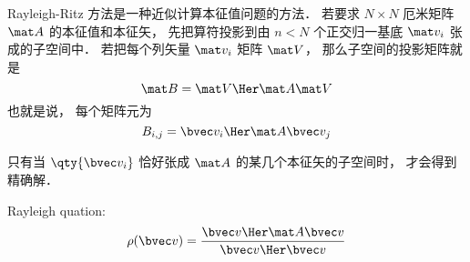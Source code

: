 
\begin{issues}
\issueDraft
\end{issues}


Rayleigh-Ritz 方法是一种近似计算本征值问题的方法． 若要求 $N\times N$ 厄米矩阵 $\mat A$ 的本征值和本征矢， 先把算符投影到由 $n < N$ 个正交归一基底 $\mat v_i$ 张成的子空间中． 若把每个列矢量 $\mat v_i$ 矩阵 $\mat V$， 那么子空间的投影矩阵就是
\begin{equation}
\mat B = \mat V\Her \mat A \mat V
\end{equation}
也就是说， 每个矩阵元为
\begin{equation}
B_{i,j} = \bvec v_i\Her \mat A \bvec v_j
\end{equation}

只有当 $\qty{\bvec v_i}$ 恰好张成 $\mat A$ 的某几个本征矢的子空间时， 才会得到精确解．

Rayleigh quation:
\begin{equation}
\rho(\bvec v) = \frac{\bvec v\Her \mat A \bvec v}{\bvec v\Her \bvec v}
\end{equation}

